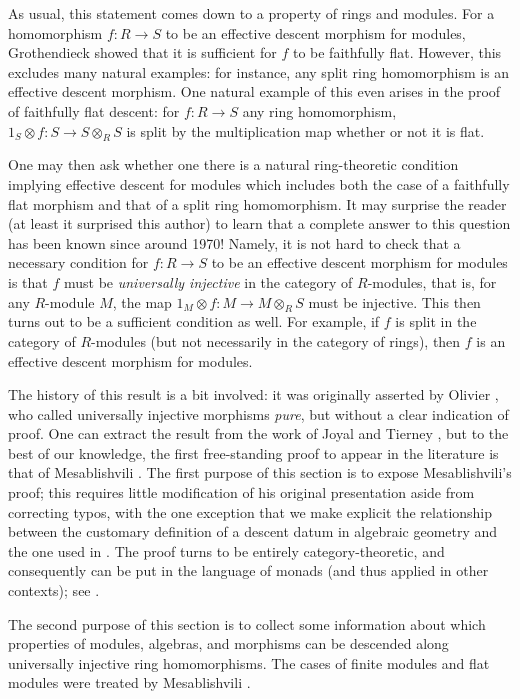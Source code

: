 \medskip\noindent
As usual, this statement comes down to a property of rings and modules.
For a homomorphism $f: R \to S$ to be an effective descent morphism for
modules, Grothendieck showed that it is sufficient for $f$ to be
faithfully flat. However, this excludes many natural examples: for instance,
any split ring homomorphism is an effective descent morphism. One natural
example of this even arises in the proof of faithfully flat descent: for
$f: R \to S$ any ring homomorphism, $1_S \otimes f: S \to S \otimes_R S$
is split by the multiplication map whether or not it is flat.

\medskip\noindent
One may then ask whether one there is a natural ring-theoretic condition 
implying effective descent for modules which includes both the case of a
faithfully flat morphism and that of a split ring homomorphism. It may
surprise the reader (at least it surprised this author) to learn that a
complete answer to this question has been known since around 1970! Namely,
it is not hard to check that a necessary condition for $f: R \to S$ to be
an effective descent morphism for modules is that $f$ must be
{\it universally injective} in the category of $R$-modules, that is, for
any $R$-module $M$, the map $1_M  \otimes f: M \to M \otimes_R S$
must be injective. This then turns out to be a sufficient condition as well.
For example, if $f$ is split in the category of $R$-modules (but not
necessarily in the category of rings), then $f$ is an effective descent
morphism for modules.
 
\medskip\noindent
The history of this result is a bit involved: it was originally asserted
by Olivier \cite{olivier}, who  called universally injective morphisms
{\it pure}, but without a clear indication of proof. One can extract the
result from the work of Joyal and Tierney \cite{joyal-tierney}, but to the
best of our knowledge, the first free-standing proof to appear in the
literature is that of Mesablishvili \cite{mesablishvili1}. The first purpose
of this section is to expose Mesablishvili's proof; this requires little
modification of his original presentation aside from correcting typos, with
the one exception that we make explicit the relationship between the
customary definition of a descent datum in algebraic geometry and the one
used in \cite{mesablishvili1}. The proof turns to be entirely
category-theoretic, and consequently can be put in the language of monads
(and thus applied in other contexts); see \cite{janelidze-tholen}.

\medskip\noindent
The second purpose of this section is to collect some information about which 
properties of modules, algebras, and morphisms can be descended along 
universally injective ring homomorphisms. The cases of finite modules
and flat modules were treated by Mesablishvili \cite{mesablishvili2}.


